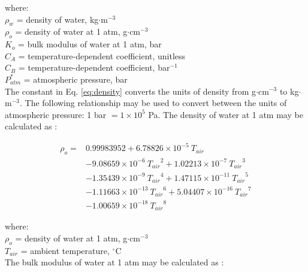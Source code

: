 \noindent where: \\
\indent $\rho_w$ = density of water, kg$\cdot$m$^{-3}$\\
\indent $\rho_o$ = density of water at 1 atm, g$\cdot$cm$^{-3}$\\
\indent $K_o$ = bulk modulus of water at 1 atm, bar\\
\indent $C_A$ = temperature-dependent coefficient, unitless\\
\indent $C_B$ = temperature-dependent coefficient, bar$^{-1}$\\
\indent $P_{atm}^{\ast}$ = atmospheric pressure, bar\\

\noindent The constant in Eq. \ref{eq:density} converts the units of density from g$\cdot$cm$^{-3}$ to kg$\cdot$m$^{-3}$. 
The following relationship may be used to convert between the units of atmospheric pressure: 1 bar $= 1\times 10^5$ Pa. 
The density of water at 1 atm may be calculated as \parencite{chen77, kell75}:

\begin{equation}
\label{eq:datm}
	\begin{split}
		\rho_o = & 0.99983952 + 6.78826\times 10^{-5}\: T_{air} \\
		          & -9.08659\times 10^{-6}\: {T_{air}}^2 
		            + 1.02213\times 10^{-7}\: {T_{air}}^3\\
		          & -1.35439\times 10^{-9}\: {T_{air}}^4 
		            + 1.47115\times 10^{-11}\: {T_{air}}^5\\
		          & -1.11663\times 10^{-13}\: {T_{air}}^6 
		            + 5.04407\times 10^{-16}\: {T_{air}}^7\\
		          & -1.00659\times 10^{-18}\: {T_{air}}^8
	\end{split}
\end{equation}

\noindent where: \\
\indent $\rho_o$ = density of water at 1 atm, g$\cdot$cm$^{-3}$\\
\indent $T_{air}$ = ambient temperature, $^{\circ}$C\\

\noindent The bulk modulus of water at 1 atm may be calculated as \parencite{chen77, kell75}:

